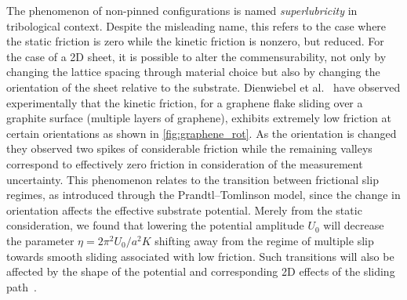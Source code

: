 

The phenomenon of non-pinned configurations is named \textit{superlubricity} in
tribological context. Despite the misleading name, this refers to the case where
the static friction is zero while the kinetic friction is nonzero, but reduced.
For the case of a 2D sheet, it is possible to alter the commensurability, not
only by changing the lattice spacing through material choice but also by
changing the orientation of the sheet relative to the substrate. Dienwiebel et
al.~\cite{DIENWIEBEL2005197} have observed experimentally that the kinetic friction, for a
graphene flake sliding over a graphite surface (multiple layers of graphene),
exhibits extremely low friction at certain orientations as shown in
\cref{fig:graphene_rot}. As the orientation is changed they observed two spikes
of considerable friction while the remaining valleys correspond to effectively
zero friction in consideration of the measurement uncertainty. This phenomenon
relates to the transition between frictional slip regimes, as introduced through the
Prandtl–Tomlinson model, since the change in orientation affects the effective
substrate potential. Merely from the static consideration, we found that
lowering the potential amplitude $U_0$ will decrease the parameter $\eta =
2\pi^2U_0/a^2K$ shifting away from the regime of multiple slip towards smooth
sliding associated with low friction. Such transitions will also be affected by
the shape of the potential and corresponding 2D effects of the sliding
path~\cite{Yalin_2011}.

